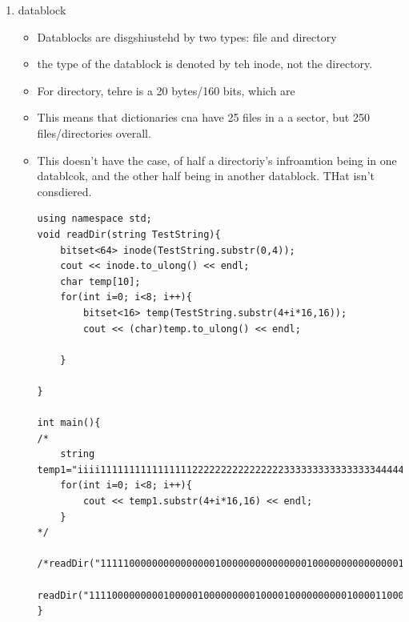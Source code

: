 \documentclass{article}
\begin{document}
\begin{enumerate}
\begin{enumerate}
\item datablock
\label{sec:org5c5a109}
\begin{itemize}
\item Datablocks are disgshiustehd by two types: file and directory
\item the type of the datablock is denoted by teh inode, not the directory.
\item For directory, tehre is a 20 bytes/160 bits, which are
\item This means that dictionaries cna have 25 files in a a sector, but 250 files/directories overall.
\item This doesn't have the case, of half a directoriy's infroamtion being in one datablcok, and the other half being in another datablock. THat isn't consdiered.
\begin{verbatim}
using namespace std;
void readDir(string TestString){
    bitset<64> inode(TestString.substr(0,4));
    cout << inode.to_ulong() << endl;
    char temp[10];
    for(int i=0; i<8; i++){
	    bitset<16> temp(TestString.substr(4+i*16,16));
	    cout << (char)temp.to_ulong() << endl;

    }

}

int main(){
/*
	string temp1="iiii11111111111111112222222222222222333333333333333344444444444444445555555555555555666666666666666677777777777777778888888888888888";
	for(int i=0; i<8; i++){
	    cout << temp1.substr(4+i*16,16) << endl;
	}
*/
	/*readDir("111110000000000000001000000000000000100000000000000010000000000000001000000000000000100000000000000010000000000000001000000000000000");*/
	readDir("111100000000010000010000000001000010000000000100001100000000010001000000000001000101000000000100011000000000010001110000000001001000");
}

\end{verbatim}
\end{itemize}



\end{enumerate}
\end{enumerate}
\end{document}
